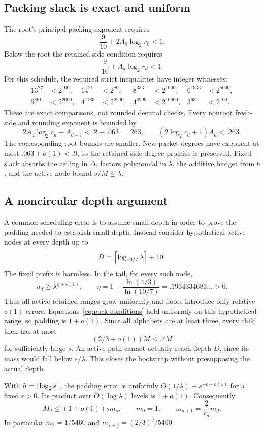 \documentclass[11pt,letterpaper]{article}
\theoremstyle{remark}\newtheorem{remark}[theorem]{Remark}
\begin{document}
\subsection{Packing slack is exact and uniform}
The root's principal packing exponent requires
\[
 \frac9{10}+2A_0\log_2r_0<1.
\]
Below the root the retained-side condition requires
\[
 \frac9{10}+A_d\log_2r_d<1.
\]
For this schedule, the required strict inequalities have integer witnesses:
\begin{align*}
13^{27}&<2^{100},&14^{21}&<2^{80},&8^{333}&<2^{1000},&6^{1933}&<2^{5000},\\
5^{861}&<2^{2000},&4^{1183}&<2^{2500},&4^{4999}&<2^{10000},&3^{63}&<2^{100}.
\end{align*}
These are exact comparisons, not rounded decimal checks. Every nonroot fresh-side and rounding exponent is bounded by
\[
 2A_d\log_2r_d+A_{d-1}<.2+.063=.263,
 \qquad (2\log_2r_d+1)A_d<.263.
\]
The corresponding root bounds are smaller. New packet degrees have exponent at most $.063+o(1)<.9$, so the retained-side degree promise is preserved. Fixed slack absorbs the ceiling in $\Delta$, factors polynomial in $\lambda$, the additive budget from $b$, and the active-node bound $s/M\le\lambda$.

\subsection{A noncircular depth argument}
A common scheduling error is to assume small depth in order to prove the padding needed to establish small depth. Instead consider hypothetical active nodes at every depth up to
\[
 D=\left\lceil\log_{10/7}\lambda\right\rceil+10.
\]
The fixed prefix is harmless. In the tail, for every such node,
\[
 u_d\ge\lambda^{\eta+o(1)},\qquad
 \eta=1-\frac{\ln(4/3)}{\ln(10/7)}=.1934334683\ldots>0.
\]
Thus all active retained ranges grow uniformly and floors introduce only relative $o(1)$ errors. Equations~\eqref{eq:pack-conditions} hold uniformly on this hypothetical range, so padding is $1+o(1)$. Since all alphabets are at least three, every child then has at most
\[
 (2/3+o(1))M\le .7M
\]
for sufficiently large $s$. An active path cannot actually reach depth $D$, since its mass would fall below $s/\lambda$. This closes the bootstrap without presupposing the actual depth.

With $h=\left\lceil\log_2s\right\rceil$, the padding error is uniformly $O(1/\lambda)+s^{-\epsilon+o(1)}$ for a fixed $\epsilon>0$. Its product over $O(\log\lambda)$ levels is $1+o(1)$. Consequently
\begin{equation}\label{eq:masses}
 M_d\le(1+o(1))s m_d,\qquad m_0=1,\qquad m_{d+1}=\frac2{r_d}m_d.
\end{equation}
In particular $m_7=1/5460$ and $m_{7+j}=(2/3)^j/5460$.
\end{document}
